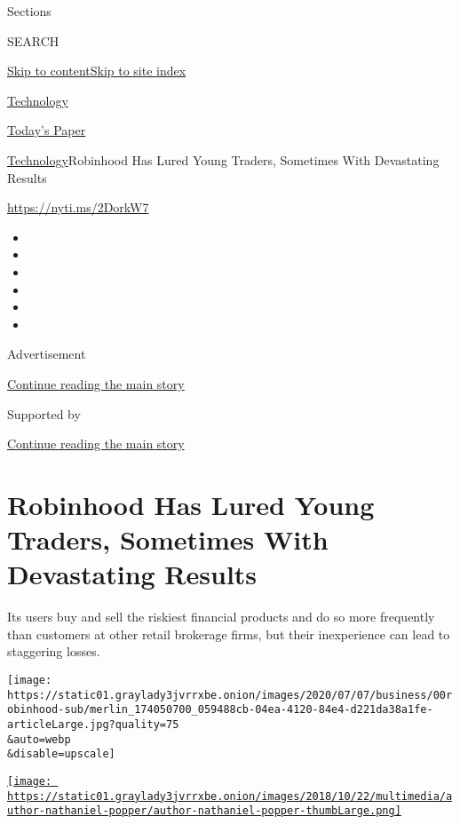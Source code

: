 Sections

SEARCH

\protect\hyperlink{site-content}{Skip to
content}\protect\hyperlink{site-index}{Skip to site index}

\href{https://www.nytimes3xbfgragh.onion/section/technology}{Technology}

\href{https://myaccount.nytimes3xbfgragh.onion/auth/login?response_type=cookie\&client_id=vi}{}

\href{https://www.nytimes3xbfgragh.onion/section/todayspaper}{Today's
Paper}

\href{/section/technology}{Technology}\textbar{}Robinhood Has Lured
Young Traders, Sometimes With Devastating Results

\url{https://nyti.ms/2DorkW7}

\begin{itemize}
\item
\item
\item
\item
\item
\item
\end{itemize}

Advertisement

\protect\hyperlink{after-top}{Continue reading the main story}

Supported by

\protect\hyperlink{after-sponsor}{Continue reading the main story}

\hypertarget{robinhood-has-lured-young-traders-sometimes-with-devastating-results}{%
\section{Robinhood Has Lured Young Traders, Sometimes With Devastating
Results}\label{robinhood-has-lured-young-traders-sometimes-with-devastating-results}}

Its users buy and sell the riskiest financial products and do so more
frequently than customers at other retail brokerage firms, but their
inexperience can lead to staggering losses.

\texttt{[image: https://static01.graylady3jvrrxbe.onion/images/2020/07/07/business/00robinhood-sub/merlin\_174050700\_059488cb-04ea-4120-84e4-d221da38a1fe-articleLarge.jpg?quality=75\\\&auto=webp\\\&disable=upscale]}

\href{https://www.nytimes3xbfgragh.onion/by/nathaniel-popper}{\texttt{[image: https://static01.graylady3jvrrxbe.onion/images/2018/10/22/multimedia/author-nathaniel-popper/author-nathaniel-popper-thumbLarge.png]}}

